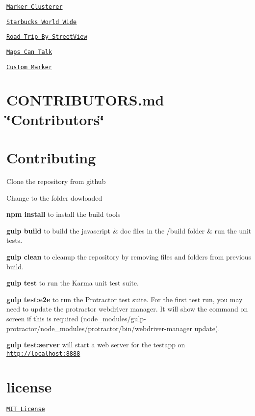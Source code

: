 \begin{DoxyItemize}
\item \href{https://rawgit.com/allenhwkim/angularjs-google-maps/master/testapp/marker-clusterer.html}{\tt Marker Clusterer}
\item \href{https://rawgit.com/allenhwkim/angularjs-google-maps/master/testapp/map_app.html}{\tt Starbucks World Wide}
\item \href{https://rawgit.com/allenhwkim/angularjs-google-maps/master/testapp/street-view_road_trip.html}{\tt Road Trip By Street\+View}
\item \href{https://rawgit.com/allenhwkim/angularjs-google-maps/master/testapp/custom-marker.html}{\tt Maps Can Talk}
\item \href{https://rawgit.com/allenhwkim/angularjs-google-maps/master/testapp/custom-marker-2.html}{\tt Custom Marker}
\end{DoxyItemize}

\section*{C\+O\+N\+T\+R\+I\+B\+U\+T\+O\+R\+S.\+md \char`\"{}\+Contributors\char`\"{} }

\section*{Contributing }


\begin{DoxyItemize}
\item Clone the repository from github
\item Change to the folder dowloaded
\item {\bfseries npm install} to install the build tools
\item {\bfseries gulp build} to build the javascript \& doc files in the /build folder \& run the unit tests.
\item {\bfseries gulp clean} to cleanup the repository by removing files and folders from previous build.
\item {\bfseries gulp test} to run the Karma unit test suite.
\item {\bfseries gulp test\+:e2e} to run the Protractor test suite. For the first test run, you may need to update the protractor webdriver manager. It will show the command on screen if this is required (node\+\_\+modules/gulp-\/protractor/node\+\_\+modules/protractor/bin/webdriver-\/manager update).
\item {\bfseries gulp test\+:server} will start a web server for the testapp on \href{http://localhost:8888}{\tt http\+://localhost\+:8888}
\end{DoxyItemize}

\section*{license }

\href{https://github.com/allenhwkim/angularjs-google-maps/blob/master/LICENSE}{\tt M\+IT License} 
